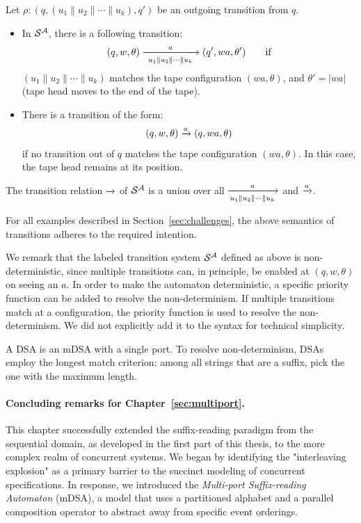 Let $\rho: (q, (u_1 \parallel u_2 \parallel \cdots \parallel u_k), q')$ be an outgoing transition from $q$. 
\begin{itemize}
\item In $\mathcal{S}^{\mathcal{A}}$, there is a following transition:
\begin{align*}
 (q, w, \theta) \xrightarrow[~u_1 \parallel u_2 \parallel \cdots \parallel u_k~]{a} (q', wa, \theta') \qquad \text{if}
\end{align*}
$(u_1 \parallel u_2 \parallel \cdots \parallel u_k)$ matches the tape configuration $(wa, \theta)$, and $\theta' = |wa|$ (tape head moves to the end of the tape).
\item There is a transition of the form:
\begin{align*}
  (q, w, \theta) \xrightarrow{a} (q, wa, \theta)
\end{align*}
if no transition out of $q$ matches the tape configuration $(wa, \theta)$. In this case, the tape head remains at its position.
\end{itemize} 

The transition relation $\xrightarrow{}$ of $\mathcal{S}^{\mathcal{A}}$ is a union over all $\xrightarrow[u_1 \parallel u_2 \parallel \cdots \parallel u_k]{a}$ and $\xrightarrow{a}$. 

 For all examples described in Section~\ref{sec:challenges}, the above semantics of transitions adheres to the required intention. 

\begin{remark}
We remark that the labeled transition system $\mathcal{S}^{\mathcal{A}}$ defined as above is non-deterministic, since multiple transitions can, in principle, be enabled at $(q, w, \theta)$ on seeing an $a$.  In order to make the automaton deterministic, a specific priority function can be added to resolve the non-determinism. If multiple transitions match at a configuration, the priority function is used to resolve the non-determinism. We did not explicitly add it to the syntax for technical simplicity.
\end{remark}

\begin{remark}
A DSA is an mDSA with a single port. To resolve non-determinism, DSAs employ the longest match criterion: among all strings that are a suffix, pick the one with the maximum length.
\end{remark}






\paragraph*{Concluding remarks for Chapter~\ref{sec:multiport}.} This chapter successfully extended the suffix-reading paradigm from the sequential domain, as developed in the first part of this thesis, to the more complex realm of concurrent systems. We began by identifying the "interleaving explosion" as a primary barrier to the succinct modeling of concurrent specifications. In response, we introduced the \textit{Multi-port Suffix-reading Automaton} (mDSA), a model that uses a partitioned alphabet and a parallel composition operator to abstract away from specific event orderings.

